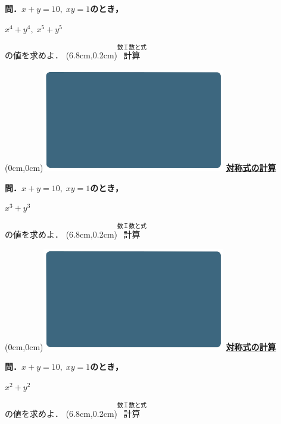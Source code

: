 \documentclass[10pt,
fleqn,
dvipdfmx,
uplatex
]{jsarticle}
\begin{document}
\Large 
\bf\boldmath 問．$x+y={10},\;xy=1$のとき，

\Huge
\hspace{0.2zw}$x^4+y^4,\;x^5+y^5$\vspace{0.3zw}

\Large
\hfill の値を求めよ．
\at(6.8cm,0.2cm){\small\color{bradorange}$\overset{\text{数Ｉ数と式}}{\text{計算}}$}

\newpage

\at(0cm,0cm){\includegraphics[width=8cm,bb=0 0 1920 1080]{./youtube/thumbnails/templates/smart_background/数I数と式.jpeg}}
{\color{orange}\bf\boldmath\huge\underline{対称式の計算}}\vspace{0.3zw}

\Large 
\bf\boldmath 問．$x+y={10},\;xy=1$のとき，

\fontsize{40}{0} \selectfont
\bf\boldmath 
\vspace{0.1zw}
\hspace{1zw}$x^3+y^3$\vspace{0.3zw}

\Large
\hfill の値を求めよ．
\at(6.8cm,0.2cm){\small\color{bradorange}$\overset{\text{数Ｉ数と式}}{\text{計算}}$}

\newpage

\at(0cm,0cm){\includegraphics[width=8cm,bb=0 0 1920 1080]{./youtube/thumbnails/templates/smart_background/数I数と式.jpeg}}
{\color{orange}\bf\boldmath\huge\underline{対称式の計算}}\vspace{0.3zw}

\Large 
\bf\boldmath 問．$x+y={10},\;xy=1$のとき，

\fontsize{40}{0} \selectfont
\bf\boldmath 
\vspace{0.1zw}
\hspace{1zw}$x^2+y^2$\vspace{0.3zw}

\Large
\hfill の値を求めよ．
\at(6.8cm,0.2cm){\small\color{bradorange}$\overset{\text{数Ｉ数と式}}{\text{計算}}$}
\end{document}
